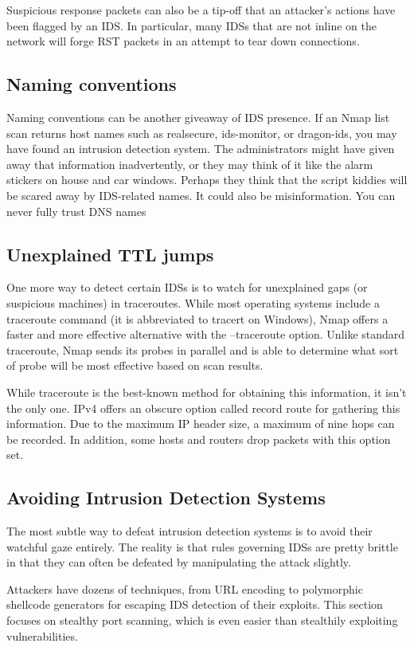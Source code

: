 Suspicious response packets can also be a tip-off that an attacker's actions have been flagged by an IDS. 
In particular, many IDSs that are not inline on the network will forge RST packets in an attempt to tear down connections.

\subsection{Naming conventions}
Naming conventions can be another giveaway of IDS presence. 
If an Nmap list scan returns host names such as realsecure, ids-monitor, or dragon-ids, you may have found an intrusion detection system. 
The administrators might have given away that information inadvertently, or they may think of it like the alarm 
stickers on house and car windows. 
Perhaps they think that the script kiddies will be scared away by IDS-related names. 
It could also be misinformation. 
You can never fully trust DNS names

\subsection{Unexplained TTL jumps}
One more way to detect certain IDSs is to watch for unexplained gaps (or suspicious machines) in traceroutes. 
While most operating systems include a traceroute command (it is abbreviated to tracert on Windows), Nmap offers a faster and more 
effective alternative with the --traceroute option. Unlike standard traceroute, Nmap sends its probes in parallel and is able to 
determine what sort of probe will be most effective based on scan results.

While traceroute is the best-known method for obtaining this information, it isn't the only one. 
IPv4 offers an obscure option called record route for gathering this information. 
Due to the maximum IP header size, a maximum of nine hops can be recorded. 
In addition, some hosts and routers drop packets with this option set.

\subsection{Avoiding Intrusion Detection Systems}
The most subtle way to defeat intrusion detection systems is to avoid their watchful gaze entirely. 
The reality is that rules governing IDSs are pretty brittle in that they can often be defeated by manipulating the attack slightly.

Attackers have dozens of techniques, from URL encoding to polymorphic shellcode generators for escaping IDS detection of their exploits. 
This section focuses on stealthy port scanning, which is even easier than stealthily exploiting vulnerabilities.


